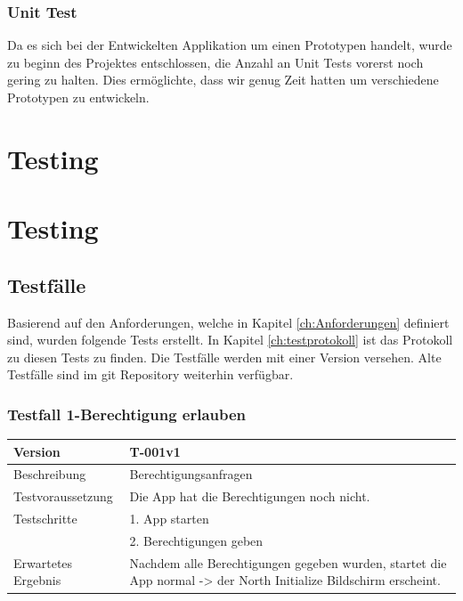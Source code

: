 \documentclass[a4paper]{scrreprt}
\begin{document}
\subsubsection{Unit Test}
Da es sich bei der Entwickelten Applikation um einen Prototypen handelt, wurde zu beginn des Projektes entschlossen, die Anzahl an Unit Tests vorerst noch gering zu halten. Dies ermöglichte, dass wir genug Zeit hatten um verschiedene Prototypen zu entwickeln.

\section{Testing}

\section{Testing}

\subsection{Testfälle}
Basierend auf den Anforderungen, welche in Kapitel \ref{ch:Anforderungen} definiert sind, wurden folgende Tests erstellt. In Kapitel \ref{ch:testprotokoll} ist das Protokoll zu diesen Tests zu finden. Die Testfälle werden mit einer Version versehen. Alte Testfälle sind im git Repository weiterhin verfügbar.

\subsubsection{Testfall 1-Berechtigung erlauben}
\begin{tabularx}{\textwidth}{|l|X|}
\hline 
	Version &
	T-001v1 \\ 
\hline 
	Beschreibung & Berechtigungsanfragen \\ 
\hline 
	Testvoraussetzung & Die App hat die Berechtigungen noch nicht. \\ 
\hline 
	Testschritte &
		1. App starten \\ &
		2. Berechtigungen geben \\
\hline
	Erwartetes Ergebnis & Nachdem alle Berechtigungen gegeben wurden, startet die App normal -> der North Initialize Bildschirm erscheint. \\ 
\hline 
\end{tabularx}
\end{document}
